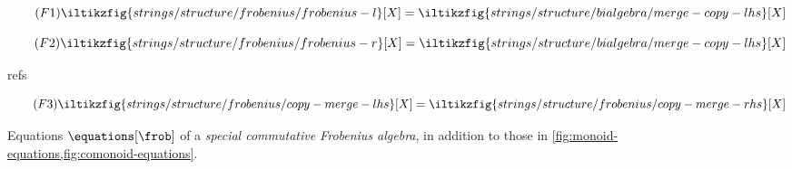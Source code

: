 \begin{figure}[p]
    \centering
    \begin{minipage}{0.27\textwidth}
        \begin{equation}
            \tag{\(\mathsf{F1}\)}
            \iltikzfig{strings/structure/frobenius/frobenius-l}[X]
            =
            \iltikzfig{strings/structure/bialgebra/merge-copy-lhs}[X]
            \label{eq:frobenius-l}
        \end{equation}
    \end{minipage}
    \begin{minipage}{0.27\textwidth}
        \begin{equation}
            \tag{\(\mathsf{F2}\)}
            \iltikzfig{strings/structure/frobenius/frobenius-r}[X]
            =
            \iltikzfig{strings/structure/bialgebra/merge-copy-lhs}[X]
            \label{eq:frobenius-r}
        \end{equation}
    \end{minipage}refs
    \begin{minipage}{0.24\textwidth}
        \begin{equation}
            \tag{\(\mathsf{F3}\)}
            \iltikzfig{strings/structure/frobenius/copy-merge-lhs}[X]
            =
            \iltikzfig{strings/structure/frobenius/copy-merge-rhs}[X]
            \label{eq:frobenius-copy-merge}
        \end{equation}
    \end{minipage}
    \caption{
        Equations \(\equations[\frob]\) of a
        \emph{special commutative Frobenius algebra}, in addition to those in
        \cref{fig:monoid-equations,fig:comonoid-equations}.
    }
    \label{fig:frobenius-equations}
\end{figure}
